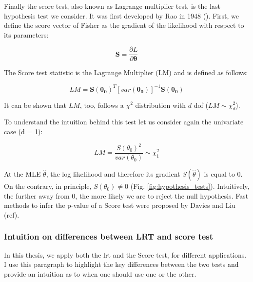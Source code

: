 Finally the score test, also known as Lagrange multiplier test, is the last hypothesis test we consider. 
It was first developed by Rao in 1948 (\cite{rao1948large}).
First, we define the score vector of Fisher as the gradient of the likelihood with respect to its parameters:

\begin{equation}\label{eq:score_vector}
    \mathbf{S} = \frac{\partial L}{\partial \boldsymbol{\theta}}
\end{equation}

The Score test statistic is the Lagrange Multiplier (LM) and is defined as follows:

\begin{equation}\label{eq:lagrange_multiplier}
    LM = \mathbf{S}(\boldsymbol{\theta_0})^T [var(\boldsymbol{\theta_0})]^{-1}\mathbf{S}(\boldsymbol{\theta_0}) 
\end{equation}

It can be shown that $LM$, too, follows a $\chi^2$ distribution with $d$ dof ($LM \sim \chi^2_d$).

To understand the intuition behind this test let us consider again the univariate case (d = 1):

\begin{equation}\label{eq:lagrange_multiplier_univariate}
    LM = \frac{S(\theta_0)^2}{var(\theta_0)} \sim \chi^2_1
\end{equation}

At the MLE $\hat{\theta}$, the log likelihood and therefore its gradient $S(\hat{\theta})$ is equal to 0.
On the contrary, in principle, $ S(\theta_0) \neq 0 $ (Fig. \ref{fig:hypothesis_tests}). 
Intuitively, the further away from 0, the more likely we are to reject the null hypothesis.
Fast methods to infer the p-value of a Score test were proposed by Davies  \cite{davies1980algorithm} and Liu (ref).




\subsubsection{Intuition on differences between LRT and score test}

In this thesis, we apply both the \gls{lrt} and the Score test, for different applications.
I use this paragraph to highlight the key differences between the two tests and provide an intuition as to when one should use one or the other.\\

